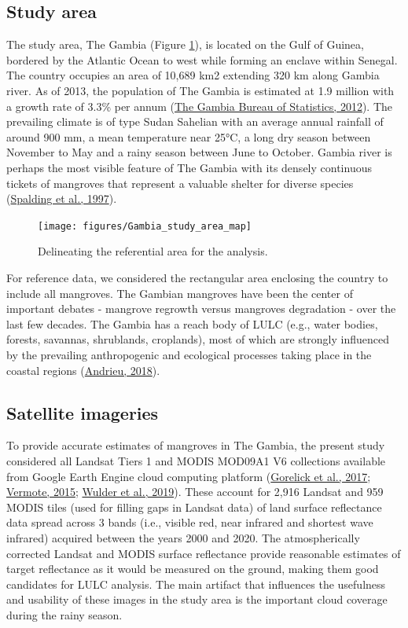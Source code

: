 \documentclass[utf8]{frontiersSCNS}
\begin{document}
\hypertarget{ref21}{%
\subsection{Study area}\label{ref21}}

The study area, The Gambia (Figure \ref{fig:fig1}), is located on the
Gulf of Guinea, bordered by the Atlantic Ocean to west while forming an
enclave within Senegal. The country occupies an area of 10,689 km2
extending 320 km along Gambia river. As of 2013, the population of The
Gambia is estimated at 1.9 million with a growth rate of 3.3\% per annum
(\protect\hyperlink{ref-TheGambiaBureauofStatistics-2013}{The Gambia
Bureau of Statistics, 2012}). The prevailing climate is of type Sudan
Sahelian with an average annual rainfall of around 900 mm, a mean
temperature near 25°C, a long dry season between November to May and a
rainy season between June to October. Gambia river is perhaps the most
visible feature of The Gambia with its densely continuous tickets of
mangroves that represent a valuable shelter for diverse species
(\protect\hyperlink{ref-Spalding-et-al-1997}{Spalding et al., 1997}).

\begin{figure}
\texttt{[image: figures/Gambia\_study\_area\_map]} \caption{Delineating the referential area for the analysis.}\label{fig:fig1}
\end{figure}

For reference data, we considered the rectangular area enclosing the
country to include all mangroves. The Gambian mangroves have been the
center of important debates - mangrove regrowth versus mangroves
degradation - over the last few decades. The Gambia has a reach body of
LULC (e.g., water bodies, forests, savannas, shrublands, croplands),
most of which are strongly influenced by the prevailing anthropogenic
and ecological processes taking place in the coastal regions
(\protect\hyperlink{ref-Andrieu-2018}{Andrieu, 2018}).

\hypertarget{ref23}{%
\subsection{Satellite imageries}\label{ref23}}

To provide accurate estimates of mangroves in The Gambia, the present
study considered all Landsat Tiers 1 and MODIS MOD09A1 V6 collections
available from Google Earth Engine cloud computing platform
(\protect\hyperlink{ref-Gorelick-et-al-2017}{Gorelick et al., 2017};
\protect\hyperlink{ref-Vermote-2015}{Vermote, 2015};
\protect\hyperlink{ref-Wulder-et-al-2019}{Wulder et al., 2019}). These
account for 2,916 Landsat and 959 MODIS tiles (used for filling gaps in
Landsat data) of land surface reflectance data spread across 3 bands
(i.e., visible red, near infrared and shortest wave infrared) acquired
between the years 2000 and 2020. The atmospherically corrected Landsat
and MODIS surface reflectance provide reasonable estimates of target
reflectance as it would be measured on the ground, making them good
candidates for LULC analysis. The main artifact that influences the
usefulness and usability of these images in the study area is the
important cloud coverage during the rainy season.
\end{document}
